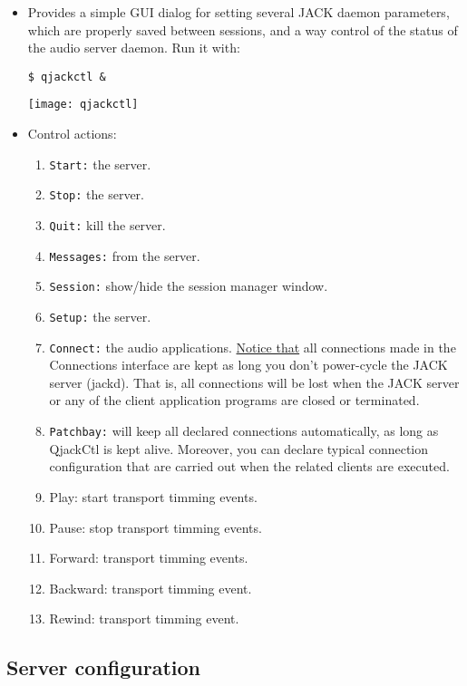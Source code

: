 \begin{itemize}
\item Provides a simple GUI dialog for setting several JACK daemon
  parameters, which are properly saved between sessions, and a way
  control of the status of the audio server daemon. Run it with:
\begin{verbatim}
$ qjackctl &
\end{verbatim}
\begin{center}
\texttt{[image: qjackctl]}
\end{center}
\item Control actions:
\begin{enumerate}
\item \texttt{Start:} the server.
\item \texttt{Stop:} the server.
\item \texttt{Quit:} kill the server.
\item \texttt{Messages:} from the server.
\item \texttt{Session:} show/hide the session manager window.
\item \texttt{Setup:} the server. 
\item \texttt{Connect:} the audio
  applications. \href{http://www.rncbc.org/drupal/node/76}{Notice
    that} all connections made in the Connections interface are kept
  as long you don't power-cycle the JACK server (jackd). That is, all
  connections will be lost when the JACK server or any of the client
  application programs are closed or terminated.
\item \texttt{Patchbay:} will keep all declared connections
  automatically, as long as QjackCtl is kept alive. Moreover, you can
  declare typical connection configuration that are carried out when
  the related clients are executed.
\item Play: start transport timming events.
\item Pause: stop transport timming events.
\item Forward: transport timming events.
\item Backward: transport timming event.
\item Rewind: transport timming event.
\end{enumerate}
\end{itemize}


\subsection{Server configuration}

